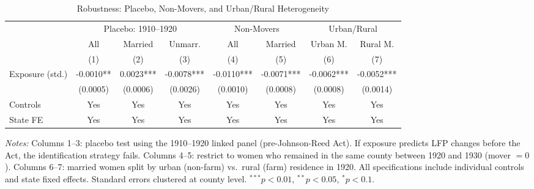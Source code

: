 \begin{table}[htbp]
\centering
\caption{Robustness: Placebo, Non-Movers, and Urban/Rural Heterogeneity}
\label{tab:robust}
\begin{adjustbox}{max width=\textwidth}
\begin{tabular}{lccccccc}
\hline\hline
 & \multicolumn{3}{c}{Placebo: 1910--1920} & \multicolumn{2}{c}{Non-Movers} & \multicolumn{2}{c}{Urban/Rural} \\
\cmidrule(lr){2-4} \cmidrule(lr){5-6} \cmidrule(lr){7-8}
 & All & Married & Unmarr. & All & Married & Urban M. & Rural M. \\
 & (1) & (2) & (3) & (4) & (5) & (6) & (7) \\
\hline
Exposure (std.) & -0.0010** & 0.0023*** & -0.0078*** & -0.0110*** & -0.0071*** & -0.0062*** & -0.0052*** \\
 & (0.0005) & (0.0006) & (0.0026) & (0.0010) & (0.0008) & (0.0008) & (0.0014) \\
\hline
Controls & Yes & Yes & Yes & Yes & Yes & Yes & Yes \\
State FE & Yes & Yes & Yes & Yes & Yes & Yes & Yes \\
\hline\hline
\end{tabular}
\end{adjustbox}
\begin{tablenotes}[flushleft]
\small
\item \textit{Notes:} Columns 1--3: placebo test using the 1910--1920 linked panel (pre-Johnson-Reed Act). If exposure predicts LFP changes before the Act, the identification strategy fails. Columns 4--5: restrict to women who remained in the same county between 1920 and 1930 (mover $= 0$). Columns 6--7: married women split by urban (non-farm) vs.~rural (farm) residence in 1920. All specifications include individual controls and state fixed effects. Standard errors clustered at county level. $^{***}p<0.01$, $^{**}p<0.05$, $^{*}p<0.1$.
\end{tablenotes}
\end{table}
